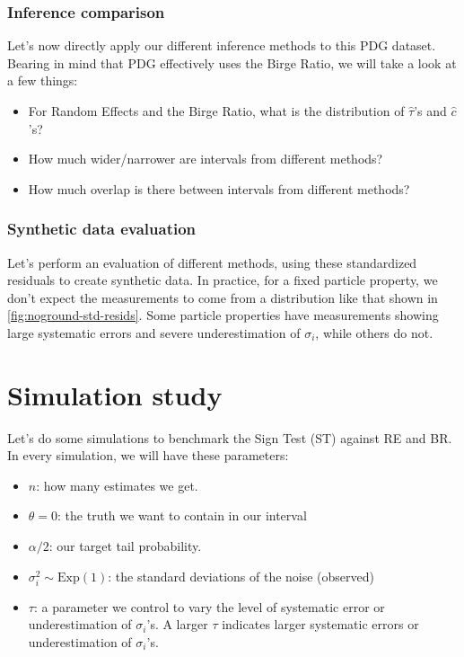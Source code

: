 \documentclass[letterpaper,12pt]{article}
\begin{document}
\subsubsection{Inference comparison}\label{inference-comparison}

Let's now directly apply our different inference methods to this PDG dataset. Bearing in mind that PDG effectively uses the Birge Ratio, we will take a look at a few things:

\begin{itemize}

\item
  For Random Effects and the Birge Ratio, what is the distribution of $\hat\tau$'s and $\hat c$'s?
\item
  How much wider/narrower are intervals from different methods?
\item
  How much overlap is there between intervals from different methods?
\end{itemize}

\subsubsection{Synthetic data evaluation}\label{synthetic-data-evaluation}

Let's perform an evaluation of different methods, using these standardized residuals to create synthetic data. In practice, for a fixed particle property, we don't expect the measurements to come from a distribution like that shown in \ref{fig:noground-std-resids}. Some particle properties have measurements showing large systematic errors and severe underestimation of $\sigma_i$, while others do not.

\section{Simulation study}\label{sec:simulation}

Let's do some simulations to benchmark the Sign Test (ST) against RE and BR. In every simulation, we will have these parameters:

\begin{itemize}
\item
  $n$: how many estimates we get.
\item
  $\theta=0$: the truth we want to contain in our interval
\item
  $\alpha/2$: our target tail probability.
\item
  $\sigma_i^2\sim\mathrm{Exp}(1)$: the standard deviations of the
  noise (observed)
\item
  $\tau$: a parameter we control to vary the level of systematic error
  or underestimation of $\sigma_i$'s. A larger $\tau$ indicates larger
  systematic errors or underestimation of $\sigma_i$'s.
\end{itemize}
\end{document}
